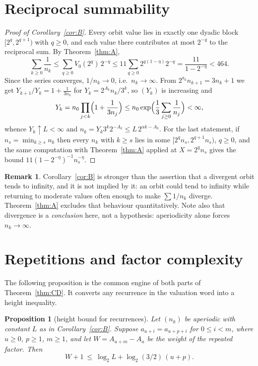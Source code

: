 \documentclass[11pt,reqno]{amsart}
\theoremstyle{plain}
\newtheorem{proposition}[theorem]{Proposition}
\theoremstyle{definition}
\newtheorem{remark}[theorem]{Remark}
\numberwithin{equation}{section}
\begin{document}
\section{Reciprocal summability}
\label{sec:recip}

\begin{proof}[Proof of Corollary~\textup{\ref{cor:B}}]
Every orbit value lies in exactly one dyadic block $[2^q,2^{q+1})$ with
$q\ge0$, and each value there contributes at most $2^{-q}$ to the reciprocal
sum.  By Theorem~\ref{thm:A},
\[
\sum_{k\ge0}\frac1{n_k}
\le\sum_{q\ge0}V_0(2^q)\,2^{-q}
\le11\sum_{q\ge0}2^{q(1-\eta)}2^{-q}
=\frac{11}{1-2^{-\eta}}<464 .
\]
Since the series converges, $1/n_k\to0$, i.e.\ $n_k\to\infty$.  From
$2^{a_k}n_{k+1}=3n_k+1$ we get
$Y_{k+1}/Y_k=1+\frac1{3n_k}$ for $Y_k=2^{A_k}n_k/3^k$, so $(Y_k)$ is
increasing and
\[
Y_k=n_0\prod_{j<k}\Bigl(1+\frac1{3n_j}\Bigr)
\le n_0\exp\Bigl(\frac13\sum_{j\ge0}\frac1{n_j}\Bigr)<\infty ,
\]
whence $Y_k\uparrow L<\infty$ and $n_k=Y_k3^k2^{-A_k}\le L\,2^{\alpha k-A_k}$.
For the last statement, if $n_s=\min_{k\ge s}n_k$ then every $n_k$ with
$k\ge s$ lies in some $[2^qn_s,2^{q+1}n_s)$, $q\ge0$, and the same computation
with Theorem~\ref{thm:A} applied at $X=2^qn_s$ gives the bound
$11(1-2^{-\eta})^{-1}n_s^{-\eta}$.
\end{proof}

\begin{remark}
Corollary~\ref{cor:B} is stronger than the assertion that a divergent orbit
tends to infinity, and it is not implied by it: an orbit could tend to
infinity while returning to moderate values often enough to make
$\sum1/n_k$ diverge.  Theorem~\ref{thm:A} excludes that behaviour
quantitatively.  Note also that divergence is a \emph{conclusion} here, not a
hypothesis: aperiodicity alone forces $n_k\to\infty$.
\end{remark}

\section{Repetitions and factor complexity}
\label{sec:symbolic}

The following proposition is the common engine of both parts of
Theorem~\ref{thm:CD}.  It converts any recurrence in the valuation word into
a height inequality.

\begin{proposition}[height bound for recurrences]
\label{prop:height}
Let $(n_k)$ be aperiodic with constant $L$ as in Corollary~\textup{\ref{cor:B}}.
Suppose $a_{u+i}=a_{u+p+i}$ for $0\le i<m$, where $u\ge0$, $p\ge1$, $m\ge1$,
and let $W=A_{u+m}-A_u$ be the weight of the repeated factor.  Then
\begin{equation}\label{eq:height}
W+1\ \le\ \log_2L+\log_2(3/2)\,(u+p).
\end{equation}
\end{proposition}
\end{document}
